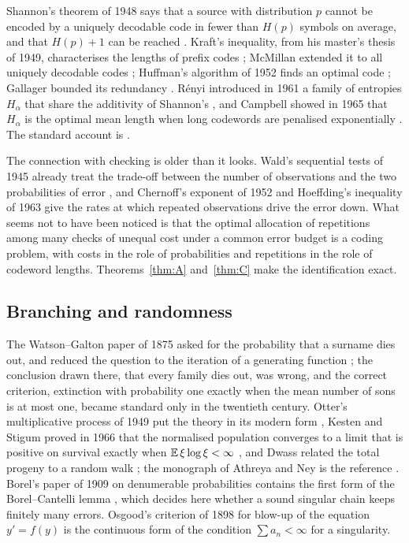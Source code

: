Shannon's theorem of 1948 says that a source with distribution $p$ cannot be encoded by a uniquely decodable code in fewer than $H(p)$ symbols on average, and that $H(p)+1$ can be reached \cite{Sha48}. Kraft's inequality, from his master's thesis of 1949, characterises the lengths of prefix codes \cite{Kra49}; McMillan extended it to all uniquely decodable codes \cite{McM56}; Huffman's algorithm of 1952 finds an optimal code \cite{Huf52}; Gallager bounded its redundancy \cite{Gal78}. R\'enyi introduced in 1961 a family of entropies $H_{\alpha}$ that share the additivity of Shannon's \cite{Ren61}, and Campbell showed in 1965 that $H_{\alpha}$ is the optimal mean length when long codewords are penalised exponentially \cite{Cam65}. The standard account is \cite{CT06}.

The connection with checking is older than it looks. Wald's sequential tests of 1945 already treat the trade-off between the number of observations and the two probabilities of error \cite{Wal45}, and Chernoff's exponent of 1952 \cite{Che52} and Hoeffding's inequality of 1963 \cite{Hoe63} give the rates at which repeated observations drive the error down. What seems not to have been noticed is that the optimal allocation of repetitions among many checks of unequal cost under a common error budget is a coding problem, with costs in the role of probabilities and repetitions in the role of codeword lengths. Theorems~\ref{thm:A} and~\ref{thm:C} make the identification exact.

\subsection{Branching and randomness}

The Watson--Galton paper of 1875 asked for the probability that a surname dies out, and reduced the question to the iteration of a generating function \cite{WG75}; the conclusion drawn there, that every family dies out, was wrong, and the correct criterion, extinction with probability one exactly when the mean number of sons is at most one, became standard only in the twentieth century. Otter's multiplicative process of 1949 put the theory in its modern form \cite{Ott49}, Kesten and Stigum proved in 1966 that the normalised population converges to a limit that is positive on survival exactly when $\mathbb{E}\,\xi\log\xi<\infty$ \cite{KS66}, and Dwass related the total progeny to a random walk \cite{Dwa69}; the monograph of Athreya and Ney is the reference \cite{AN72}. Borel's paper of 1909 on denumerable probabilities contains the first form of the Borel--Cantelli lemma \cite{Bor09}, which decides here whether a sound singular chain keeps finitely many errors. Osgood's criterion of 1898 for blow-up of the equation $y'=f(y)$ \cite{Osg98} is the continuous form of the condition $\sum a_{n}<\infty$ for a singularity.

